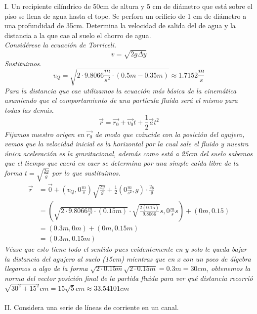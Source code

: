 \documentclass{article}
\begin{document}
I. Un recipiente cilíndrico de 50cm de altura y 5 cm de diámetro que está sobre el piso se llena de agua hasta el tope. Se perfora un orificio de 1 cm de diámetro a una profundidad de 35cm. Determina la velocidad de salida del de agua y la distancia a la que cae al suelo el chorro de agua. \\
\textit{Considérese la ecuación de Torriceli.}\\
\begin{equation}
    v = \sqrt{2g \Delta y}
\end{equation}
\textit{Sustituimos.}
\begin{equation*}
    v_Q = \sqrt{2 \cdot 9.8066\frac{m}{s^2} \cdot (0.5m-0.35m)} \approx 1.7152 \frac{m}{s}
\end{equation*}
\textit{Para la distancia que cae utilizamos la ecuación más básica de la cinemática asumiendo que el comportamiento de una partícula fluída será el mismo para todas las demás.}
\begin{equation}
    \Vec{r}=\Vec{r_0} + \Vec{v_0}t + \frac{1}{2}\Vec{a}t^2
\end{equation}
\textit{Fijamos nuestro origen en $\Vec{r_0}$ de modo que coincide con la posición del agujero, vemos que la velocidad inicial es la horizontal por la cual sale el fluido y nuestra única aceleración es la gravitacional, además como está a 25cm del suelo sabemos que el tiempo que caerá en caer se determina por una simple caída libre de la forma $t=\sqrt{\frac{2y}{g}}$ por lo que sustituimos.}
\begin{align*}
    \Vec{r} &= \Vec{0} + (v_Q, 0 \frac{m}{s})\sqrt{\frac{2y}{g}} + \frac{1}{2}(0 \frac{m}{s^2},g)\cdot\frac{2y}{g} \\
    &= (\sqrt{2 \cdot 9.8066\frac{m}{s^2} \cdot (0.15m) }\cdot \sqrt{\frac{2(0.15)}{9.8066}}s, 0 \frac{m}{s}s) + (0m,0.15) \\
    &= (0.3m,0m) + (0m,0.15m) \\
    &= (0.3m,0.15m)
\end{align*}
\textit{Véase que esto tiene todo el sentido pues evidentemente en y solo le queda bajar la distancia del agujero al suelo (15cm) mientras que en x con un poco de álgebra llegamos a algo de la forma $\sqrt{2\cdot 0.15m}\sqrt{2\cdot 0.15m}=0.3m=30cm$, obtenemos la norma del vector posición final de la partida fluida para ver qué distancia recorrió $\sqrt{30^2+15^2}cm=15\sqrt{5}cm\approx 33.54101cm$}\\\\
II. Considera una serie de líneas de corriente en un canal. \\
\end{document}
